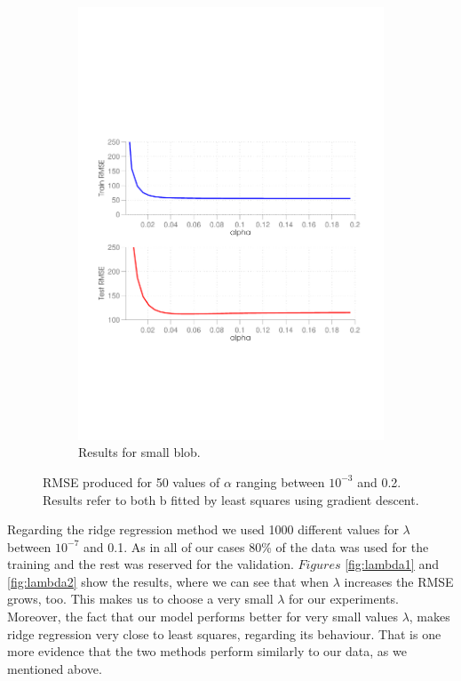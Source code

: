 \begin{figure}[ht]
\begin{subfigure}[b]{0.45\textwidth}
  \end{subfigure}
  \begin{subfigure}[b]{0.45\textwidth}
    \includegraphics[width=\textwidth]{figures/alpha_curve2.pdf}
    \caption{Results for small blob.}
    \label{fig:alpha2}
  \end{subfigure}
  \caption{RMSE produced for 50 values of $\alpha$ ranging between $10^{-3}$ and 0.2. Results refer to both b fitted by least squares using gradient descent.}
\end{figure}

Regarding the ridge regression method we used 1000 different values for $\lambda$ between $10^{-7}$ and 0.1. As in all of our cases 80\% of the data was used for the training and the rest was reserved for the validation. $Figures$ \ref{fig:lambda1} and \ref{fig:lambda2} show the results, where we can see that when $\lambda$ increases the RMSE grows, too. This makes us to choose a very small $\lambda$ for our experiments. Moreover, the fact that our model performs better for very small values $\lambda$, makes ridge regression very close to least squares, regarding its behaviour. That is one more evidence that the two methods perform similarly to our data, as we mentioned above.

